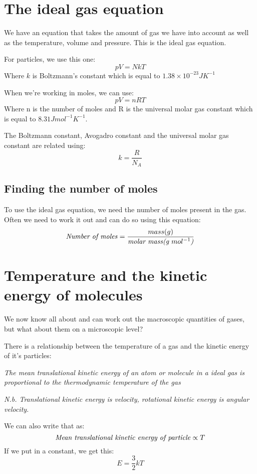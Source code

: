 \documentclass{article}
\begin{document}
\section*{The ideal gas equation}
We have an equation that takes the amount of gas we have into account as well as the temperature, volume and pressure. This is the ideal gas equation.

For particles, we use this one:
\[
	pV = NkT
\]	
Where $k$ is Boltzmann's constant which is equal to $1.38 \times 10^{-23}JK^{-1}$

When we're working in moles, we can use:
\[
	pV = nRT
\]
Where n is the number of moles and R is the universal molar gas constant which is equal to $8.31Jmol^{-1}K^{-1}$.

The Boltzmann constant, Avogadro constant and the universal molar gas constant are related using:
\[
	k = \frac{R}{N_A}
\]

\subsection*{Finding the number of moles}
To use the ideal gas equation, we need the number of moles present in the gas. Often we need to work it out and can do so using this equation:
\[
	\textrm{\textit{Number of moles}} = \frac{mass(g)}{\textrm{\textit{molar mass(g $mol^{-1}$)}}}
\]

\section*{Temperature and the kinetic energy of molecules}
We now know all about and can work out the macroscopic quantities of gases, but what about them on a microscopic level?

There is a relationship between the temperature of a gas and the kinetic energy of it's particles:

\textit{The mean translational kinetic energy of an atom or molecule in a ideal gas is proportional to the thermodynamic temperature of the gas}

\textit{N.b. Translational kinetic energy is velocity, rotational kinetic energy is angular velocity.}

We can also write that as:
\[
	\textrm{\textit{Mean translational kinetic energy of particle}} \propto T
\]
If we put in a constant, we get this:
\[
	E = \frac{3}{2}kT
\]
\end{document}

